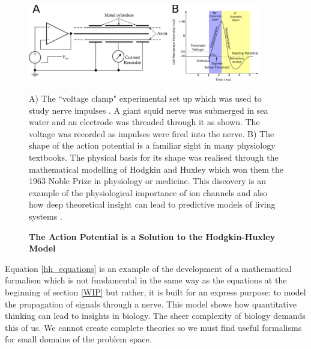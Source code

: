 \begin{figure}
	\begin{center}
		\includegraphics[width=0.9\textwidth]{figures/Hodgkin-Huxley_action_potential.pdf}
	\end{center}
	\captionsetup{singlelinecheck = false, justification=raggedright}
	\caption[The Action Potential is a Solution to the Hodkin-Huxley Model] {\textbf{The Action Potential is a Solution to the Hodgkin-Huxley Model }}{ A) The ``voltage clamp" experimental set up which was used to study nerve impulses \cite{zotero-2930}. A giant squid nerve was submerged in sea water and an electrode was threaded through it as shown. The voltage was recorded as impulses were fired into the nerve. B) The shape of the action potential is a familiar sight in many physiology textbooks. The physical basis for its shape was realised through the mathematical modelling of Hodgkin and Huxley which won them the 1963 Noble Prize in physiology or medicine. This discovery is an example of the physiological importance of ion channels and also how deep theoretical insight can lead to predictive models of living systems \cite{hodgkin1952, hodgkin1952a, hodgkin1952b, hodgkin1952c, hodgkin1952d}.}
	\label{action_potential_graphic}
\end{figure}


Equation \ref{hh_equations} is an example of the development of a mathematical formalism which is not fundamental in the same way as the equations at the beginning of section \ref{WIP} but rather, it is built for an express purpose: to model the propagation of signals through a nerve. This model shows how quantitative thinking can lead to insights in biology. The sheer complexity of biology demands this of us. We cannot create complete theories so we must find useful formalisms for small domains of the problem space.

